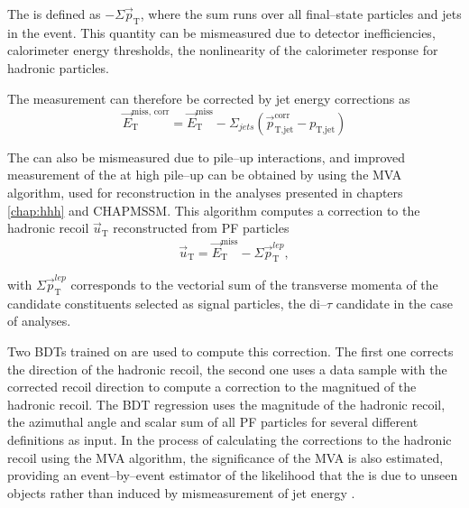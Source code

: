 The \MET is defined as $-\Sigma \vec{p}_{\text{T}}$, where
the sum runs over all final--state particles and jets in the event. This quantity
can be mismeasured due to detector inefficiencies, calorimeter energy thresholds,
the nonlinearity of the calorimeter
response for hadronic particles.


The \MET measurement can therefore be corrected by jet energy corrections as
\begin{equation}\label{eqn:objects_met_corr}
\vec{E}_{\text{T}}^{\text{miss, corr}} = \vec{E}_{\text{T}}^{\text{miss}} - \Sigma_{jets} (\vec{p}_{\text{T,jet}}^{\text{corr}} - p_{\text{T,jet}})
\end{equation}

The \MET can also be mismeasured due to pile--up interactions, and improved
measurement of the \MET at high pile--up can be obtained by using the MVA \MET
algorithm, used for \MET reconstruction in the analyses presented in chapters \ref{chap:hhh} and 
CHAPMSSM. This algorithm computes a correction to the hadronic
recoil $\vec{u}_{\text{T}}$ reconstructed from \ac{PF} particles
\begin{equation}\label{eqn:objects_met_recoil}
\vec{u}_{\text{T}} = \vec{E}_{\text{T}}^{\text{miss}} - \Sigma \vec{p}_{\text{T}}^{lep},
\end{equation}

with $\Sigma \vec{p}_{\text{T}}^{lep}$ corresponds to the vectorial sum of the transverse momenta of the
candidate constituents selected as signal particles, the di--$\tau$ candidate in the case of \htotautau
analyses.

Two \ac{BDTs} trained on \Zmm  are used to compute this correction.
The first one corrects the direction of the hadronic recoil, the second
one uses a data sample with the corrected recoil direction to compute a correction
to the magnitued of the hadronic recoil. The BDT regression uses the magnitude of the hadronic
recoil, the azimuthal angle and scalar \pT sum of all \ac{PF} particles for several 
different \MET definitions \cite{cms-met-run1} as input. 
In the process of calculating the corrections to the hadronic recoil using the MVA \MET
algorithm, the significance of the MVA \MET is also estimated, providing an event--by--event
estimator of the likelihood that the \MET is due to unseen objects rather than induced
by mismeasurement of jet energy \cite{cms-met-run1}.

